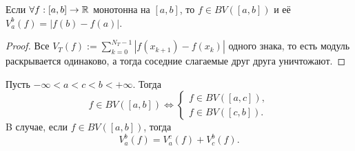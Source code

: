 \begin{lemma}
    Если $\forall f:[a, b] \rightarrow \mathbb{R}$ монотонна на $[a, b]$, то $f \in B V([a, b])$ и её $V_a^b(f)=|f(b)-f(a)|$.
\end{lemma} 
\begin{proof}
    Все $V_T(f):=\sum_{k=0}^{N_T-1}\left|f\left(x_{k+1}\right)-f\left(x_k\right)\right|$ одного знака, то есть модуль раскрывается одинаково, а тогда соседние слагаемые друг друга уничтожают.
\end{proof}

\begin{lemma}
    Пусть $-\infty<a<c<b<+\infty$. Тогда
    $$
    f \in B V([a, b]) \Longleftrightarrow\left\{\begin{array}{l}
    f \in B V([a, c]), \\
    f \in B V([c, b]).
    \end{array}\right.
    $$
    B случае, если $f \in B V([a, b])$, тогда
    $$V_a^b(f)=V_a^c(f)+V_c^b(f).$$
\end{lemma} 
